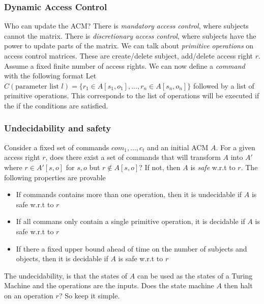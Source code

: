         \begin{frame}
            \frametitle{Dynamic Access Control}
                Who can update the ACM? There is \textit{mandatory access control}, where subjects cannot the matrix. There is \textit{discretionary access control}, where subjects have the power to update parts of the matrix. 
                We can talk about \textit{primitive operations} on access control matrices. These are create/delete subject, add/delete access right $r$. Assume a fixed finite number of access rights. We can now define a \textit{command} with the following format
                Let $C(\text{parameter list } l) = \{r_1 \in A[s_1, o_1], ... , r_n \in A[s_n, o_n]\}$ followed by a list of primitive operations. This corresponds to the list of operations will be executed if the if the conditions are satisfied. 
        \end{frame}
        \begin{frame}
            \frametitle{Undecidability and safety}
                Consider a fixed set of commands $com_1, ..., c_t$ and an initial ACM $A$. For a given access right $r$, does there exist a set of commands that will transform $A$ into $A'$ where $r \in A'[s, o]$ for $s, o$ but $r \notin A[s, o]$? If not, then $A$ is \textit{safe} w.r.t to $r$. 
                The following properties are provable
                    \begin{itemize}
                        \item If commands contains more than one operation, then it is undecidable if $A$ is safe w.r.t to $r$
                        \item If all commans only contain a single primitive operation, it is decidable if $A$ is safe w.r.t to $r$
                        \item If there a fixed upper bound ahead of time on the number of subjects and objects, then it is decidable if $A$ is safe w.r.t to $r$    
                    \end{itemize}
                    The undecidability, is that the states of $A$ can be used as the states of a Turing Machine and the operations are the inputs. Does the state machine $A$ then halt on an operation $r$? So keep it simple. 
        \end{frame}




